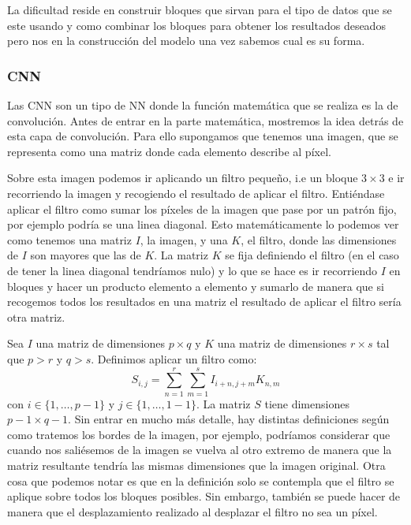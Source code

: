 \documentclass[a4paper,12pt,twoside,titlepage]{article}
\begin{document}
La dificultad reside en construir bloques que sirvan para el tipo de datos que se este usando y como combinar los bloques para obtener los resultados deseados pero nos en la construcción del modelo una vez sabemos cual es su forma.

\subsubsection*{CNN}

Las CNN son un tipo de NN donde la función matemática que se realiza es la de convolución. Antes de entrar en la parte matemática, mostremos la idea detrás de esta capa de convolución. Para ello supongamos que tenemos una imagen, que se representa como una matriz donde cada elemento describe al píxel.

Sobre esta imagen podemos ir aplicando un filtro pequeño, i.e un bloque $3\times 3$ e ir recorriendo la imagen y recogiendo el resultado de aplicar el filtro. Entiéndase aplicar el filtro como sumar los píxeles de la imagen que pase por un patrón fijo, por ejemplo podría se una linea diagonal. Esto matemáticamente lo podemos ver como tenemos una matriz $I$, la imagen, y una $K$, el filtro, donde las dimensiones de $I$ son mayores que las de $K$. La matriz $K$ se fija definiendo el filtro (en el caso de tener la linea diagonal tendríamos nulo) y lo que se hace es ir recorriendo $I$ en bloques y hacer un producto elemento a elemento y sumarlo de manera que si recogemos todos los resultados en una matriz el resultado de aplicar el filtro sería otra matriz.

Sea $I$ una matriz de dimensiones $p\times q$ y $K$ una matriz de dimensiones $r\times s$ tal que $p>r$ y $q>s$. Definimos aplicar un filtro como:
\begin{equation}
  \label{ec:def_filtro}
  S_{i, j} = \sum_{n=1}^{r}\sum_{m=1}^{s}I_{i + n, j + m}K_{n,m}
\end{equation}
con $i\in\{1,\dots, p -1 \}$ y $j\in\{1,\dots, 1 -1\}$. La matriz $S$ tiene dimensiones $p-1\times q-1$. Sin entrar en mucho más detalle, hay distintas definiciones según como tratemos los bordes de la imagen, por ejemplo, podríamos considerar que cuando nos saliésemos de la imagen se vuelva al otro extremo de manera que la matriz resultante tendría las mismas dimensiones que la imagen original. Otra cosa que podemos notar es que en la definición solo se contempla que el filtro se aplique sobre todos los bloques posibles. Sin embargo, también se puede hacer de manera que el desplazamiento realizado al desplazar el filtro no sea un píxel.
\end{document}
